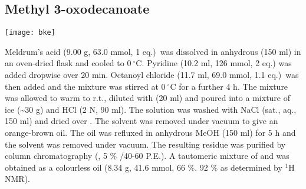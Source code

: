 \newpage

\subsection{Methyl 3-oxodecanoate }

\begin{scheme}[H]
	\begin{center}
		\texttt{[image: bke]}
	\end{center}
\end{scheme}

Meldrum's acid  (9.00 g, 63.0 mmol, 1 eq.)\ was dissolved in anhydrous  (150 ml) in an oven-dried flask and cooled to $0\ ^{\circ}$C. Pyridine (10.2 ml, 126 mmol, 2 eq.) was added dropwise over 20 min. Octanoyl chloride  (11.7 ml, 69.0 mmol, 1.1 eq.)\ was then added and the mixture was stirred at $0\ ^{\circ}$C for a further 4 h. 
The mixture was allowed to warm to r.t., diluted with  (20 ml) and poured into a mixture of ice (\textasciitilde 30 g) and HCl (2 N, 90 ml). The solution was washed with NaCl (sat., aq., 150 ml) and dried over . The solvent was removed under vacuum to give an orange-brown oil.
The oil was refluxed in anhydrous MeOH (150 ml) for 5 h and the solvent was removed under vacuum. The resulting residue was purified by column chromatography (, 5 \% /40-60 P.E.). A tautomeric mixture of  and  was obtained as a colourless oil (8.34 g, 41.6 mmol, 66 \%. 92 \%  as determined by $^{1}$H NMR).


